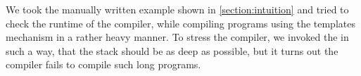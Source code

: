 

We took the manually written \Pascal example shown in \cref{section:intuition}
  and tried to check the runtime of the \Java compiler, while compiling
  programs using the templates mechanism in a rather heavy manner.
To stress the compiler, we invoked the \RLLp in such a way, that the 
  stack should be as deep as possible, but it turns out the \Java compiler
  fails to compile such long programs.
